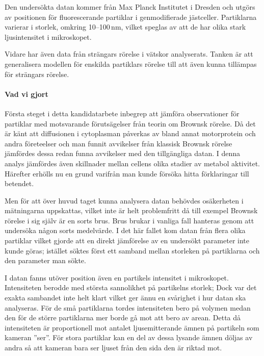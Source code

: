 Den undersökta datan kommer från Max Planck Institutet i Dresden och utgörs av positionen för fluorescerande partiklar i genmodifierade jästceller. Partiklarna varierar i storlek, omkring 10--100\,nm, vilket speglas av att de har olika stark ljusintensitet i mikroskopet. 

Vidare har även data från strängars rörelse i vätskor analyserats. Tanken är att 
generalisera modellen för enskilda partiklars rörelse till att även kunna tillämpas för strängars rörelse.


\paragraph{Vad vi gjort}
Första steget i detta kandidatarbete inbegrep att jämföra observationer för partiklar med motsvarande förutsägelser från teorin om Brownsk rörelse. Då det är känt att diffusionen i cytoplasman påverkas av bland annat motorprotein och andra företeelser och man funnit avvikelser från klassisk Brownsk rörelse \cite{Gou_etal2014} jämfördes dessa redan funna avvikelser med den tillgängliga datan. I denna analys jämfördes även skillnader mellan cellens olika stadier av metabol aktivitet. Härefter erhölls nu en grund varifrån man kunde försöka hitta förklaringar till betendet.

Men för att över huvud taget kunna analysera datan behövdes osäkerheten i mätningarna uppskattas, vilket inte är helt problemfritt då till exempel Brownsk rörelse i sig själv är en sorts brus. Brus brukar i vanliga fall hanteras genom att undersöka någon sorts medelvärde. I det här fallet kom datan från flera olika partiklar vilket gjorde att en direkt jämförelse av en undersökt parameter inte kunde göras; istället söktes först ett samband mellan storleken på partiklarna och den parameter man sökte.

I datan fanns utöver position även en partikels intensitet i mikroskopet. Intensiteten berodde med största sannolikhet på partikelns storlek; Dock var det exakta sambandet inte helt klart vilket ger ännu en svårighet i hur datan ska analyseras. För de små partiklarna tordes intensiteten bero på volymen medan den för de större partiklarna mer borde gå mot att bero av arean. Detta då intensiteten är proportionell mot antalet ljusemitterande ämnen på partikeln som kameran ''ser''. För stora partiklar kan en del av dessa lysande ämnen döljas av andra så att kameran bara ser ljuset från den sida den är riktad mot. 

